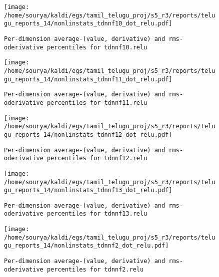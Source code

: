 \documentclass[prl,10pt,twocolumn]{revtex4}
\begin{document}
\newpage
\begin{figure}[h]
  \begin{center}
    \caption{\texttt{Per-dimension average-(value, derivative) and rms-oderivative percentiles for tdnnf10.relu}}
    \texttt{[image: /home/sourya/kaldi/egs/tamil\_telugu\_proj/s5\_r3/reports/telugu\_reports\_14/nonlinstats\_tdnnf10\_dot\_relu.pdf]}
  \end{center}
\end{figure}
\clearpage


\newpage
\begin{figure}[h]
  \begin{center}
    \caption{\texttt{Per-dimension average-(value, derivative) and rms-oderivative percentiles for tdnnf11.relu}}
    \texttt{[image: /home/sourya/kaldi/egs/tamil\_telugu\_proj/s5\_r3/reports/telugu\_reports\_14/nonlinstats\_tdnnf11\_dot\_relu.pdf]}
  \end{center}
\end{figure}
\clearpage


\newpage
\begin{figure}[h]
  \begin{center}
    \caption{\texttt{Per-dimension average-(value, derivative) and rms-oderivative percentiles for tdnnf12.relu}}
    \texttt{[image: /home/sourya/kaldi/egs/tamil\_telugu\_proj/s5\_r3/reports/telugu\_reports\_14/nonlinstats\_tdnnf12\_dot\_relu.pdf]}
  \end{center}
\end{figure}
\clearpage


\newpage
\begin{figure}[h]
  \begin{center}
    \caption{\texttt{Per-dimension average-(value, derivative) and rms-oderivative percentiles for tdnnf13.relu}}
    \texttt{[image: /home/sourya/kaldi/egs/tamil\_telugu\_proj/s5\_r3/reports/telugu\_reports\_14/nonlinstats\_tdnnf13\_dot\_relu.pdf]}
  \end{center}
\end{figure}
\clearpage


\newpage
\begin{figure}[h]
  \begin{center}
    \caption{\texttt{Per-dimension average-(value, derivative) and rms-oderivative percentiles for tdnnf2.relu}}
    \texttt{[image: /home/sourya/kaldi/egs/tamil\_telugu\_proj/s5\_r3/reports/telugu\_reports\_14/nonlinstats\_tdnnf2\_dot\_relu.pdf]}
  \end{center}
\end{figure}
\clearpage
\end{document}
